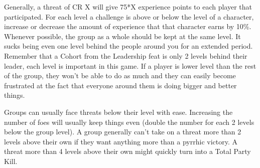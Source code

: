 Generally, a threat of CR X will give 75*X experience points to each player that participated. For each level a challenge is above or below the level of a character, increase or decrease the amount of experience that that character earns by 10\%. Whenever possible, the group as a whole should be kept at the same level. It sucks being even one level behind the people around you for an extended period. Remember that a Cohort from the Leadership feat is only 2 levels behind their leader, each level is important in this game. If a player is lower level than the rest of the group, they won't be able to do as much and they can easily become frustrated at the fact that everyone around them is doing bigger and better things.

Groups can usually face threats below their level with ease. Increasing the number of foes will usually keep things even (double the number for each 2 levels below the group level). A group generally can't take on a threat more than 2 levels above their own if they want anything more than a pyrrhic victory. A threat more than 4 levels above their own might quickly turn into a Total Party Kill.
